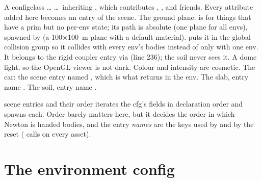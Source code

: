 \begin{explain}
 A configclass \ldots
{} \ldots\ inheriting , which contributes
  , ,  and friends.
  Every attribute added here becomes an entry of the scene.
 The ground plane.  is for things that
  have a prim but no per-env state; its path is absolute (one plane for all
  envs), spawned by  (a 100$\times$100~m plane with a
  default material).  puts it in the global
  collision group so it collides with every env's bodies instead of only
  with one env. It belongs to the rigid coupler entry via
   (line 236); the soil never sees it.
 A dome light, so the OpenGL viewer is not dark. Colour and
  intensity are cosmetic.
 The car: the scene entry named , which is what
   returns in the env.
 The slab, entry name .
 The soil, entry name .
\end{explain}

\begin{isaacbox}{scene entries and their order}
 iterates the cfg's fields in declaration order and
spawns each. Order barely matters here, but it decides the order in which
Newton is handed bodies, and the entry \emph{names} are the keys used by
 and by the reset ( calls
 on every asset).
\end{isaacbox}

\section{The environment config}


